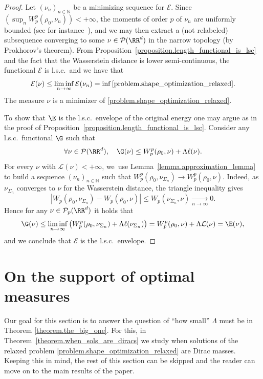 \begin{proof}
Let $\left(\nu_n\right)_{n \in \mathbb{N}}$ be a minimizing sequence for $\mathcal{E}$. Since $\left(\sup_n W_p^p(\rho_0, \nu_n)\right)<+\infty$, the moments of order $p$ of $\nu_n$ are uniformly bounded (see for instance~\cite[Th.\,5.11]{santambrogio2015optimal}), and we may then extract a (not relabeled) subsequence converging to some $\nu \in \mathcal{P}(\RR^d)$ in the narrow topology (by Prokhorov's theorem). From Proposition~\ref{proposition.length_functional_is_lsc} and the fact that the Wasserstein distance is lower semi-continuous, the functional $\mathcal{E}$ is l.s.c.~and we have that
\[
\mathcal{E}(\nu) \le \liminf_{n \to \infty} \mathcal{E}(\nu_n) = \inf \eqref{problem.shape_optimization_relaxed}.
\]
The measure $\nu$ is a minimizer of \eqref{problem.shape_optimization_relaxed}.

To show that $\E$ is the l.s.c.~envelope of the original energy one may argue as in the proof of Proposition~\ref{proposition.length_functional_is_lsc}. Consider any l.s.c.~functional $\G$ such that
\begin{equation*}
\forall \nu \in \mathcal{P}(\RR^d),\quad \G(\nu)\leq W_p^p(\rho_0,\nu) +\Lambda \ell(\nu).
\end{equation*}
For every $\nu$ with $\mathcal{L}(\nu)<+\infty$, we~use Lemma~\ref{lemma.approximation_lemma} to build a sequence $(\nu_n)_{n \in \mathbb{N}}$ such that $W_p^p(\rho_0,\nu_{\Sigma_n}) \to W_p^p(\rho_0,\nu)$. Indeed, as $\nu_{\Sigma_n}$ converges to $\nu$ for the Wasserstein distance, the triangle inequality gives
\[
\left|
W_p(\rho_0, \nu_{\Sigma_n}) - W_p(\rho_0, \nu)
\right|
\le
W_p(\nu_{\Sigma_n}, \nu) \xrightarrow[n \to \infty]{} 0.
\]
Hence for any $\nu \in \mathcal{P}_p(\RR^d)$ it holds that
\begin{equation*}
\G(\nu)\leq \liminf_{n \to \infty} \left(W_p^p(\rho_0,\nu_{\Sigma_n})
+
\Lambda \ell(\nu_{\Sigma_n})\right)= W_p^p(\rho_0,\nu) +\Lambda \mathcal{L}(\nu)=\E(\nu),
\end{equation*}
and we conclude that $\mathcal{E}$ is the l.s.c.~envelope.
\end{proof}

\section{On the support of optimal measures}\label{section.geometric_properties_transport_map}
Our goal for this section is to answer the question of ``how small'' $\Lambda$ must be in Theorem \ref{theorem.the_big_one}. For this, in Theorem~\ref{theorem.when_sols_are_diracs} we study when solutions of the relaxed problem \eqref{problem.shape_optimization_relaxed} are Dirac masses. Keeping this in mind, the rest of this section can be skipped and the reader can move on to the main results of the paper.

